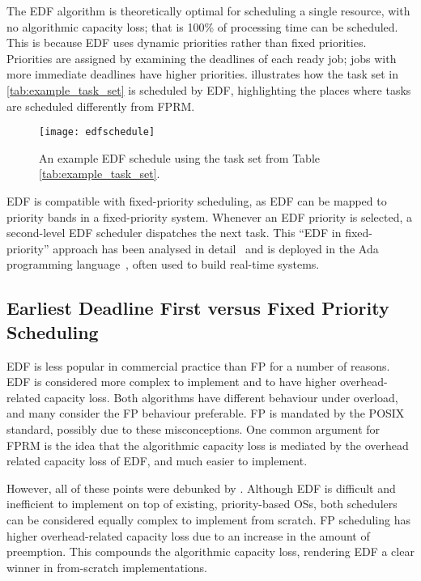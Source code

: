 The \gls{EDF} algorithm is theoretically optimal for scheduling a single resource, with no
algorithmic capacity loss; that is 100\% of processing time can be scheduled. This is because
\gls{EDF} uses dynamic priorities rather than fixed priorities. 
Priorities are assigned by examining the deadlines of each ready job; jobs with more immediate deadlines have higher priorities.
 illustrates how the task set in \cref{tab:example_task_set} is scheduled by
\gls{EDF}, highlighting the places where tasks are scheduled differently from FPRM.

\begin{figure}
	\begin{center}
		\leavevmode
		\texttt{[image: edfschedule]}
		\caption{An example EDF schedule using the task set from Table \ref{tab:example_task_set}.}
		\label{f:edf-schedule}
	\end{center}
\end{figure}

\gls{EDF} is compatible with fixed-priority scheduling, as \gls{EDF} can be mapped to priority bands
in a fixed-priority system. Whenever an \gls{EDF} priority is selected, a second-level \gls{EDF}
scheduler dispatches the next task. This ``EDF in fixed-priority'' approach has been analysed in
detail~\citep{Harbour_Palencia_03} and is deployed in the Ada programming
language~\citep{Baruah_Wellings:crtpa}, often used to build real-time systems.

\subsection{Earliest Deadline First versus Fixed Priority Scheduling}
\label{s:overload}

\gls{EDF} is less popular in commercial practice than \gls{FP} for a number of reasons.  \gls{EDF}
is considered more complex to implement and to have higher overhead-related capacity loss.
Both algorithms have different behaviour under overload, and many consider the \gls{FP} behaviour
preferable. \gls{FP}
is mandated by the POSIX standard, possibly due to these misconceptions. One common argument for
\gls{FPRM} is the idea that the algorithmic capacity loss is mediated by the overhead related
capacity loss of \gls{EDF}, and much easier to implement. 

However, all of these points were debunked by \citet{Buttazzo_05}.  Although \gls{EDF} is difficult
and inefficient to implement on top of existing, priority-based \glspl{OS}, both schedulers
can be considered equally complex to implement from scratch.  \gls{FP} scheduling has higher
overhead-related capacity loss due to an increase in the amount of preemption.  This compounds the
algorithmic capacity loss, rendering \gls{EDF} a clear winner in from-scratch implementations.

